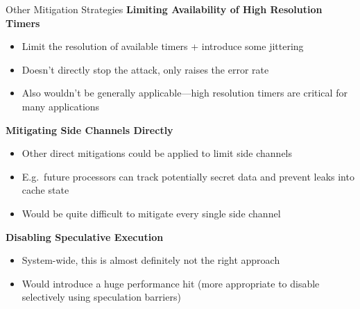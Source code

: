 \documentclass[10pt, dvipsnames, aspectratio=169]{beamer}
\begin{document}
\begin{frame}[c]{Other Mitigation Strategies}{}
  {\bf Limiting Availability of High Resolution Timers}
  \begin{itemize}
    \item Limit the resolution of available timers + introduce some jittering
    \item Doesn't directly stop the attack, only raises the error rate
    \item Also wouldn't be generally applicable---high resolution timers are critical for many applications
  \end{itemize}

  \vfill
  {\bf Mitigating Side Channels Directly}
  \begin{itemize}
    \item Other direct mitigations could be applied to limit side channels
    \item E.g.~future processors can track potentially secret data and prevent leaks into cache state
    \item Would be quite difficult to mitigate every single side channel
  \end{itemize}

  \vfill
  {\bf Disabling Speculative Execution}
  \begin{itemize}
    \item System-wide, this is almost definitely not the right approach
    \item Would introduce a huge performance hit (more appropriate to disable selectively using speculation barriers)
  \end{itemize}
\end{frame}
\end{document}
